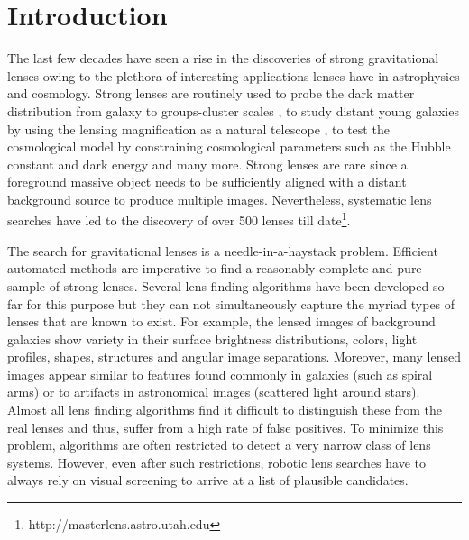\documentclass[useAMS,usenatbib,a4paper]{mn2e}
\begin{document}
\setcounter{footnote}{1}


\section{Introduction}
\label{sec:intro}


The last few decades have seen a rise in the discoveries of strong
gravitational lenses owing to the plethora of interesting applications
lenses have in astrophysics and cosmology. Strong lenses are routinely
used to probe the dark matter distribution from galaxy
\citep[e.g.][]{Koopmans2006,Barnabe2009,Sonnenfeld2015} to groups-cluster
scales
\citep[e.g.][]{Limousin2008,Zitrin2011,Oguri2012,More2012,Newman2013}, to
study distant young galaxies by using the lensing magnification as a
natural telescope \citep[e.g.][]{Zitrin2009,Zheng2012,Whitaker2014}, to
test the cosmological model by constraining cosmological parameters such
as the Hubble constant and dark energy
\citep[e.g.][]{Suyu2010,Collett2012,Collett2014,Sereno2014} and many more. Strong
lenses are rare since a foreground massive object needs to be
sufficiently aligned with a distant background source to produce
multiple images. Nevertheless, systematic lens searches have led to the
discovery of over 500 lenses till
date\footnote{http://masterlens.astro.utah.edu}.

The search for gravitational lenses is a needle-in-a-haystack problem.
Efficient automated methods are imperative to find a reasonably complete
and pure sample of strong lenses. Several lens finding algorithms have
been developed so far for this purpose
\citep[e.g.][]{Lenzen2004,Alard2006,Seidel2007,More2012,Gavazzi2014} but they can not
simultaneously capture the myriad types of lenses that are known to
exist. For example, the lensed images of background galaxies show
variety in their surface brightness distributions, colors, light
profiles, shapes, structures and angular image separations.  Moreover,
many lensed images appear similar to features found commonly in galaxies
(such as spiral arms) or to artifacts in astronomical images (scattered
light around stars).  Almost all lens finding algorithms find it
difficult to distinguish these from the real lenses and thus, suffer
from a high rate of false positives.  To minimize this problem,
algorithms are often restricted to detect a very narrow class of lens
systems. However, even after such restrictions, robotic lens searches
have to always rely on visual screening to arrive at a list of plausible
candidates.
\end{document}
